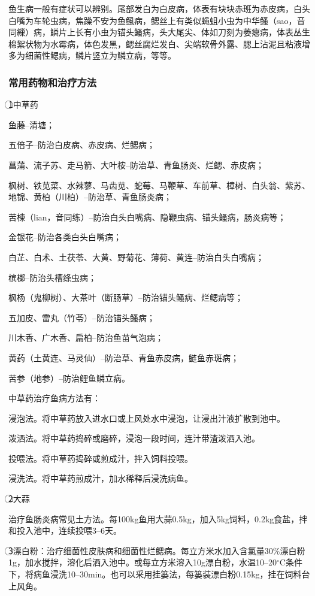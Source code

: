 \documentclass{ctexbook}
\begin{document}
鱼生病一般有症状可以辨别。尾部发白为白皮病，体表有块块赤班为赤皮病，白头白嘴为车轮虫病，焦躁不安为鱼鲺病，鳃丝上有类似蝇蛆小虫为中华鳋（sao，音同繅）病，鳞片上长有小虫为锚头鳋病，头大尾尖、体如刀刻为萎瘪病，体表丛生棉絮状物为水霉病，体色发黑，鳃丝腐烂发白、尖端软骨外露、腮上沾泥且粘液增多为细菌性鳃病，鳞片竖立为鳞立病，等等。
\subsubsection{常用药物和治疗方法}
\textcircled{1}中草药

鱼藤--清塘；

五倍子--防治白皮病、赤皮病、烂鳃病；

菖蒲、流子苏、走马箭、大叶桉--防治草、青鱼肠炎、烂鳃、赤皮病；

枫树、铁苋菜、水辣蓼、马齿苋、蛇莓、马鞭草、车前草、樟树、白头翁、紫苏、地锦、黄柏（川柏）--防治草、青鱼肠炎病；

苦楝（lian，音同练）--防治白头白嘴病、隐鞭虫病、锚头鳋病，肠炎病等；

金银花--防治各类白头白嘴病；

白芷、白术、土茯苓、大黄、野菊花、薄荷、黄连--防治白头白嘴病；

槟榔--防治头槽绦虫病；

枫杨（鬼柳树）、大茶叶（断肠草）--防治锚头鳋病、烂鳃病等；

五加皮、雷丸（竹苓）--防治锚头鳋病；

川木香、广木香、扁柏--防治鱼苗气泡病；

黄药（土黄连、马灵仙）--防治草、青鱼赤皮病，鲢鱼赤斑病；

苦参（地参）--防治鲤鱼鳞立病。

中草药治疗鱼病方法有：

浸泡法。将中草药放入进水口或上风处水中浸泡，让浸出汁液扩散到池中。

泼洒法。将中草药捣碎或磨碎，浸泡一段时间，连汁带渣泼洒入池。

投喂法。将中草药捣碎或煎成汁，拌入饲料投喂。

浸洗法。将中草药煎成汁，加水稀释后浸洗病鱼。

\textcircled{2}大蒜

治疗鱼肠炎病常见土方法。每100kg鱼用大蒜0.5kg，加入5kg饲料，0.2kg食盐，拌和投入池中，连续投喂3--6天。

\textcircled{3}漂白粉：治疗细菌性皮肤病和细菌性烂鳃病。每立方米水加入含氯量30\%漂白粉1g，加水搅拌，溶化后洒入池中。或每立方米溶入10g漂白粉，水温10--20$^{\circ}$C条件下，将病鱼浸洗10--30min。也可以采用挂篓法，每篓装漂白粉0.15kg，挂在饲料台上风角。
\end{document}
